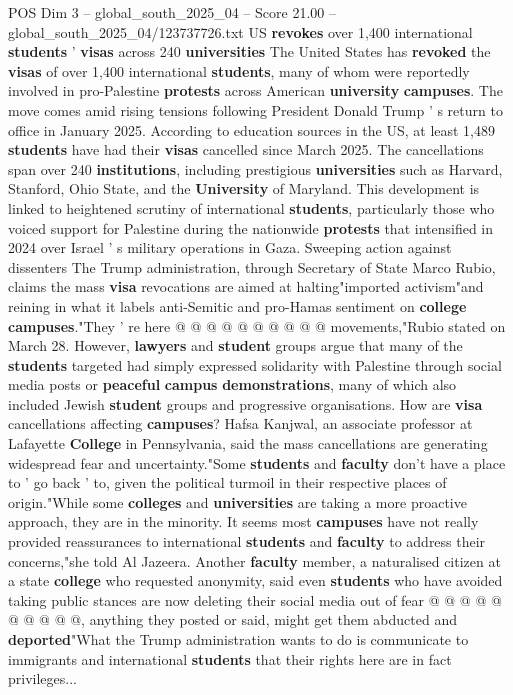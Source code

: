 \begin{textsample}{POS Dim 3 – global\_south\_2025\_04 – Score 21.00 – global\_south\_2025\_04/123737726.txt}  \label{ex:f3_pos_118}
US \textbf{revokes} over 1,400 international \textbf{students} ' \textbf{visas} across 240 \textbf{universities} The United States has \textbf{revoked} the \textbf{visas} of over 1,400 international \textbf{students}, many of whom were reportedly involved in pro-Palestine \textbf{protests} across American \textbf{university} \textbf{campuses}.
The move comes amid rising tensions following President Donald Trump ' s return to office in January 2025.
According to education sources in the US, at least 1,489 \textbf{students} have had their \textbf{visas} cancelled since March 2025.
The cancellations span over 240 \textbf{institutions}, including prestigious \textbf{universities} such as Harvard, Stanford, Ohio State, and the \textbf{University} of Maryland.
This development is linked to heightened scrutiny of international \textbf{students}, particularly those who voiced support for Palestine during the nationwide \textbf{protests} that intensified in 2024 over Israel ' s military operations in Gaza.
Sweeping action against dissenters The Trump administration, through Secretary of State Marco Rubio, claims the mass \textbf{visa} revocations are aimed at halting"imported activism"and reining in what it labels anti-Semitic and pro-Hamas sentiment on \textbf{college} \textbf{campuses}."They ' re here @ @ @ @ @ @ @ @ @ @ movements,"Rubio stated on March 28.
However, \textbf{lawyers} and \textbf{student} groups argue that many of the \textbf{students} targeted had simply expressed solidarity with Palestine through social media posts or \textbf{peaceful} \textbf{campus} \textbf{demonstrations}, many of which also included Jewish \textbf{student} groups and progressive organisations.
How are \textbf{visa} cancellations affecting \textbf{campuses}?
Hafsa Kanjwal, an associate professor at Lafayette \textbf{College} in Pennsylvania, said the mass cancellations are generating widespread fear and uncertainty."Some \textbf{students} and \textbf{faculty} don't have a place to ' go back ' to, given the political turmoil in their respective places of origin."While some \textbf{colleges} and \textbf{universities} are taking a more proactive approach, they are in the minority.
It seems most \textbf{campuses} have not really provided reassurances to international \textbf{students} and \textbf{faculty} to address their concerns,"she told Al Jazeera.
Another \textbf{faculty} member, a naturalised citizen at a state \textbf{college} who requested anonymity, said even \textbf{students} who have avoided taking public stances are now deleting their social media out of fear @ @ @ @ @ @ @ @ @ @, anything they posted or said, might get them abducted and \textbf{deported}"What the Trump administration wants to do is communicate to immigrants and international \textbf{students} that their rights here are in fact privileges...

\end{textsample}
